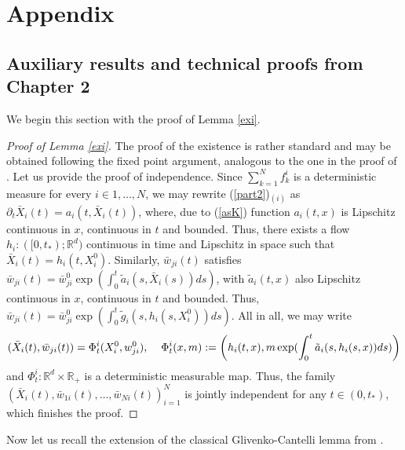 \documentclass[10pt]{article}
\newcommand{\hd}{\hspace{0.2cm}}
\newcommand{\R}{\mathbb{R}}
\newcommand{\xb}{\bar{X}}
\newcommand{\wji}{w_{ji}}
\newcommand{\wjib}{\bar{w}_{ji}}
\newcommand{\fik}{f^i_k}
\begin{document}
\section{Appendix}

\subsection{Auxiliary results and technical proofs from Chapter 2}

We begin this section with the proof of Lemma \ref{exi}.

\begin{proof}[Proof of Lemma \ref{exi}]
The proof of the existence is rather standard and may be obtained following the fixed point argument, analogous to the one in the proof of \cite[Lemma 3]{nasza}. Let us provide the proof of independence. Since $\sum_{k=1}^N\fik$ is a deterministic measure for every $i \in 1,\dots, N$, we may rewrite (\ref{part2})$_{(i)}$ as $\partial_t \xb_i(t)=a_i(t,\xb_i(t))$, where, due to (\ref{asK}) function $a_i(t,x)$ is Lipschitz continuous in $x$, continuous in $t$ and bounded. Thus, there exists a flow $h_i:([0,t_{*});\R^d)$ continuous in time and Lipschitz in space such that $\xb_i(t) = h_i(t,X^0_i)$. Similarly, $\wjib(t)$ satisfies $\wjib(t)=\wjib^0\exp(\int_0^t\tilde{a}_i(s,\xb_i(s))ds)$, with $\tilde{a}_i(t,x)$ also Lipschitz continuous in $x$, continuous in $t$ and bounded. Thus, $\wjib(t)=\wjib^0\exp(\int_0^t\tilde{g}_i(s,h_i(s,X^0_i))ds)$. All in all, we may write 
\[
(\xb_i(t),\wjib(t)) = \Phi^i_t(X^0_i,\wji^0), \hd \hd \Phi^i_t(x,m):= \left(h_i(t,x),m\exp(\int_0^t\tilde{a}_i(s,h_i(s,x))ds)\right)
\]
and $\Phi^i_t:\R^d \times \R_{+}$ is a deterministic measurable map. Thus, the family  $(\xb_{i}(t),\bar{w}_{1i}(t),\dots,\bar{w}_{Ni}(t))_{i=1}^N$  is jointly independent for any $t \in (0,t_{*})$, which finishes the proof.
\end{proof}

Now let us recall the extension of the classical Glivenko-Cantelli lemma from \cite{Dudley}.
\end{document}
